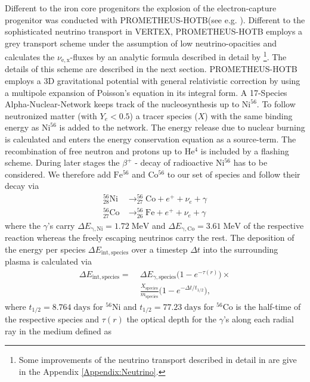 \documentclass[fleqn,usenatbib]{mnras}
\newcommand{\helium}{$\mathrm{He^{4}}$\xspace}
\newcommand{\nickel}{$\mathrm{Ni^{56}}$\xspace}
\newcommand{\iron}{$\mathrm{Fe^{56}}$\xspace}
\newcommand{\cobalt}{$\mathrm{Co^{56}}$\xspace}
\newcommand{\prom}{\textsc{P{\footnotesize ROMETHEUS}-H{\footnotesize OT}B}\xspace}
\newcommand{\vertex}{\textsc{V{\footnotesize ERTEX}}\xspace}
\begin{document}
Different to the iron core progenitors the explosion of the electron-capture progenitor was conducted with \prom (see e.g. \citet{Wongwathanarat2012,Wongwathanarat2013}).
Different to the sophisticated neutrino transport in \vertex, \prom employs a grey transport scheme under the assumption of low neutrino-opacities and calculates the $\nu_{\mathrm{e,x}}$-fluxes by an analytic formula described in detail by \cite{Scheck2006}\footnote{Some improvements of the neutrino transport described in detail in \cite{Scheck2006} are give in the Appendix \ref{Appendix:Neutrino}.}. The details of this scheme are described in the next section.
\prom employs a 3D gravitational potential with general relativistic correction by using a multipole expansion of Poisson's equation in its integral form. 
A 17-Species Alpha-Nuclear-Network keeps track of the nucleosynthesis up to $\mathrm{Ni}^{56}$. To follow neutronized matter (with $Y_e < 0.5 $) a tracer species ($X$) with the same binding energy as $\mathrm{Ni}^{56}$ is added to the network. The energy release due to nuclear burning is calculated and enters the energy conservation equation as a source-term. 
The recombination of free neutron and protons up to \helium is included by a flashing scheme.
During later stages the $\beta^{+}$ - decay of radioactive \nickel has to be considered. We therefore add \iron and \cobalt to our set of species and follow their decay via
\begin{equation}
\begin{split}
	_{28} ^{56} \mathrm{Ni}& \rightarrow _{27} ^{56} \mathrm{Co} + e^+ + \nu_e + \gamma \\
	_{27} ^{56} \mathrm{Co}& \rightarrow _{26} ^{56} \mathrm{Fe} + e^+ + \nu_e + \gamma 
\end{split}
\end{equation}
where the $\gamma$'s carry $\Delta E_{\mathrm{\gamma,Ni}} = 1.72\;\mathrm{MeV}$ and $\Delta E_{\mathrm{\gamma,Co}} =3.61\;\mathrm{MeV}$ of the respective reaction whereas the freely escaping neutrinos carry the rest. The deposition of the energy per species $\Delta E_{\mathrm{int, species}}$ over a timestep $\Delta t$ into the surrounding plasma is calculated via
\begin{equation}
\begin{split}
		\Delta E_{\mathrm{int, species}} = \; &  \Delta E_{\gamma,\mathrm{species}} \Big( 1 - e^{-\tau(r)} \Big) \times\\ \; & \frac{X_{\mathrm{species}}}{m_{\mathrm{species}}} \Big( 1 - e^{-\Delta t / t_{1/2}} \Big),
 \end{split}
\end{equation}where $t_{1/2} = 8.764\; \mathrm{days}$ for $^{56}\mathrm{Ni}$ and $t_{1/2} = 77.23\; \mathrm{days}$  for $^{56}\mathrm{Co}$ is the half-time of the respective species and $\tau(r)$ the optical depth for the $\gamma$'s along each radial ray in the medium defined as
\end{document}
